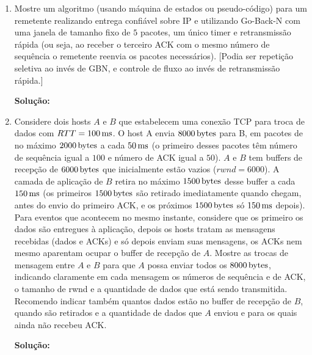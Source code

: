 \documentclass{article}
\begin{document}
\begin{enumerate}
\begin{enumerate}[a)]
\item Dê um exemplo de aplicação para a qual a comutação por circuitos é mais adequada e um para a qual a por pacotes é preferível.
\begin{addmargin}[0.5in]{0.5in}
\par \textbf{Solução:}
A comutação por circuitos é mais adequada para chamadas telefônicas e a comutação por pacotes é mais adequada para comunicações com a internet.
\end{addmargin}

\end{enumerate}

\item Mostre um algoritmo (usando máquina de estados ou pseudo-código) para um remetente realizando entrega confiável sobre IP e utilizando Go-Back-N com uma janela de tamanho fixo de $5$ pacotes, um único timer e retransmissão rápida (ou seja, ao receber o terceiro ACK com o mesmo número de sequência o remetente reenvia os pacotes necessários). [Podia ser repetição seletiva ao invés de GBN, e controle de fluxo ao invés de retransmissão rápida.]
\begin{addmargin}[0.5in]{0.5in}
\par \textbf{Solução:}
\end{addmargin}

\item Considere dois hosts $A$ e $B$ que estabelecem uma conexão TCP para troca de dados com $RTT=\unit[100]{ms}$. O host A envia $\unit[8000]{bytes}$ para B, em pacotes de no máximo $\unit[2000]{bytes}$ a cada $\unit[50]{ms}$ (o primeiro desses pacotes têm número de sequência igual a $100$ e número de ACK igual a $50$). $A$ e $B$ tem buffers de recepção de $\unit[6000]{bytes}$ que inicialmente estão vazios ($rwnd = 6000$). A camada de aplicação de $B$ retira no máximo $\unit[1500]{bytes}$ desse buffer a cada $\unit[150]{ms}$ (os primeiros $\unit[1500]{bytes}$ são retirado imediatamente quando chegam, antes do envio do primeiro ACK, e os próximos $\unit[1500]{bytes}$ só $\unit[150]{ms}$ depois). Para eventos que acontecem no mesmo instante, considere que os primeiro os dados são entregues à aplicação, depois os hosts tratam as mensagens recebidas (dados e ACKs) e só depois enviam suas mensagens, os ACKs nem mesmo aparentam ocupar o buffer de recepção de $A$. Mostre as trocas de mensagem entre $A$ e $B$ para que $A$ possa enviar todos os $\unit[8000]{bytes}$, indicando claramente em cada mensagem os números de sequência e de ACK, o tamanho de rwnd e a quantidade de dados que está sendo transmitida. Recomendo indicar também quantos dados estão no buffer de recepção de $B$, quando são retirados e a quantidade de dados que $A$ enviou e para os quais ainda não recebeu ACK.
\begin{addmargin}[0.5in]{0.5in}
\par \textbf{Solução:}
\end{addmargin}

\end{enumerate}
\end{document}
